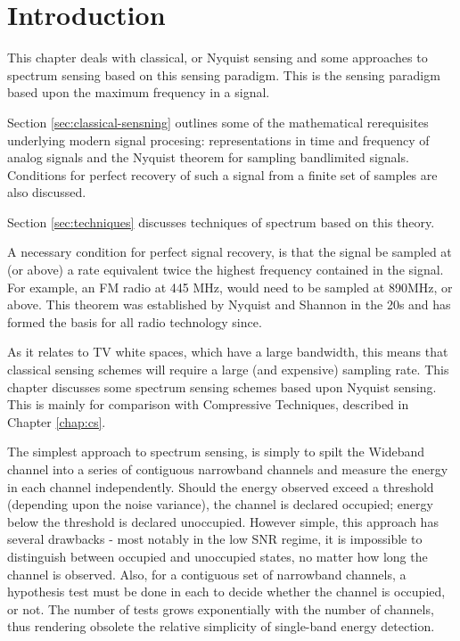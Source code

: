 \label{chap:classical-sensning}
\section{Introduction}
This chapter deals with classical, or Nyquist sensing and some approaches to spectrum sensing based on this sensing paradigm. This is the sensing paradigm based upon the maximum frequency in a signal. 

Section \ref{sec:classical-sensning} outlines some of the mathematical rerequisites underlying modern signal procesing: representations in time and frequency of analog signals and the Nyquist theorem for sampling bandlimited signals. Conditions for perfect recovery of such a signal from a finite set of samples are also discussed.

Section \ref{sec:techniques} discusses techniques of spectrum based on this theory.

A necessary condition for perfect signal recovery, is that the signal be sampled at (or above) a rate equivalent twice the highest frequency contained in the signal. For example, an FM radio at 445 MHz, would need to be sampled at 890MHz, or above. This theorem was established by Nyquist and Shannon in the 20s and has formed the basis for all radio technology since. 

As it relates to TV white spaces, which have a large bandwidth, this means that classical sensing schemes will require a large (and expensive) sampling rate. This chapter discusses some spectrum sensing schemes based upon Nyquist sensing. This is mainly for comparison with Compressive Techniques, described in Chapter \ref{chap:cs}.

The simplest approach to spectrum sensing, is simply to spilt the Wideband channel into a series of contiguous narrowband channels and measure the energy in each channel independently. Should the energy observed exceed a threshold (depending upon the noise variance), the channel is declared occupied; energy below the threshold is declared unoccupied. However simple, this approach has several drawbacks - most notably in the low SNR regime, it is impossible to distinguish between occupied and unoccupied states, no matter how long the channel is observed. Also, for a contiguous set of narrowband channels, a hypothesis test must be done in each to decide whether the channel is occupied, or not. The number of tests grows exponentially with the number of channels, thus rendering obsolete the relative simplicity of single-band energy detection.

